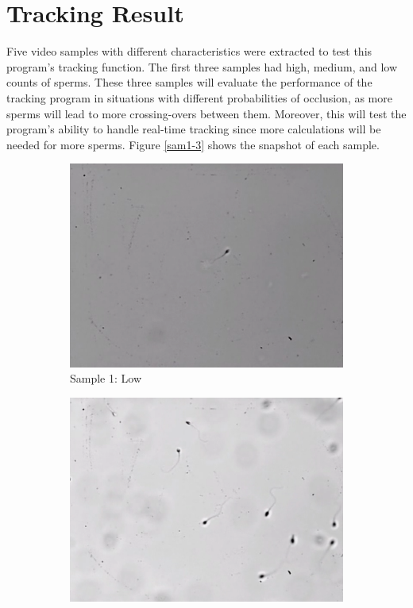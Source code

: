 \section{Tracking Result}
Five video samples with different characteristics were extracted to test this program's tracking function. The first three samples had high, medium, and low counts of sperms. These three samples will evaluate the performance of the tracking program in situations with different probabilities of occlusion, as more sperms will lead to more crossing-overs between them. Moreover, this will test the program's ability to handle real-time tracking since more calculations will be needed for more sperms. Figure \ref{sam1-3} shows the snapshot of each sample. 

\begin{figure}[h]
     \centering
     \begin{subfigure}[b]{0.31\textwidth}
         \centering
         \includegraphics[width=\textwidth]{Images/low.png}
         \caption{Sample 1: Low}
         \label{sam1}
     \end{subfigure}
     \hfill
     \begin{subfigure}[b]{0.31\textwidth}
         \centering
         \includegraphics[width=\textwidth]{Images/med.png}

\end{subfigure}
\end{figure}
